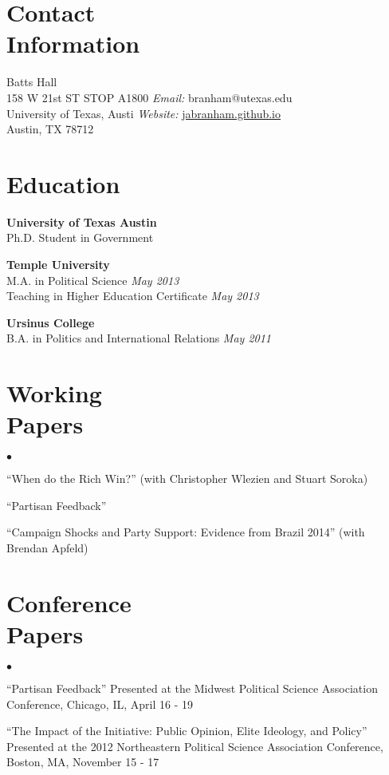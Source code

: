 \documentclass[margin,line]{res}
\newenvironment{list2}{
    \begin{list}{$\bullet$}{%
        \setlength{\itemsep}{0in}
        \setlength{\parsep}{0in} \setlength{\parskip}{0in}
        \setlength{\topsep}{0in} \setlength{\partopsep}{0in}
        \setlength{\leftmargin}{0.2in}}}{\end{list}}
\begin{document}

\begin{resume}


\section{\sc Contact \\Information}
Batts Hall               \hfill     \\
158 W 21st ST STOP A1800                     \hfill    {\em Email:}    branham@utexas.edu \\
University of Texas, Austi     \hfill    {\em Website:}   \href{https://jabranham.github.io}{jabranham.github.io} \\
Austin, TX 78712                  \hfill


\section{\sc Education}
{\bf University of Texas Austin}     \hfill     \\
 Ph.D. Student in Government       \hfill 

{\bf Temple University} \hfill  \\
M.A. in Political Science  \hfill     {\em  May 2013} \\
Teaching in Higher Education Certificate \hfill {\em May 2013}

{\bf Ursinus College}   \hfill     \\ 
B.A. in Politics and International Relations    \hfill      {\em May 2011} \\

\section{\sc Working\\Papers}
\begin{list2}
	\item ``When do the Rich Win?'' (with Christopher Wlezien and Stuart Soroka)
	\item ``Partisan Feedback''
	\item ``Campaign Shocks and Party Support: Evidence from Brazil 2014'' (with Brendan Apfeld)
\end{list2}

\section{\sc Conference\\Papers}
\begin{list2}
	\item ``Partisan Feedback'' Presented at the Midwest Political Science Association Conference, Chicago, IL, April 16 - 19
	\item ``The Impact of the Initiative: Public Opinion, Elite Ideology, and Policy'' Presented at the 2012 Northeastern Political Science Association Conference, Boston, MA, November 15 - 17
\end{list2}


\end{resume}
\end{document}
